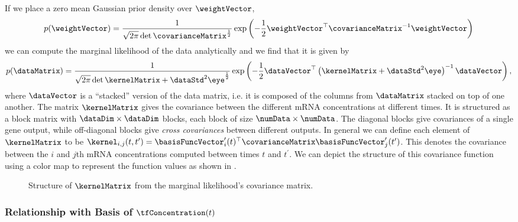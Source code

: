 \documentclass{article}
\begin{document}
If we place a zero mean Gaussian prior density over $\weightVector$,
\[
p(\weightVector)=\frac{1}{\sqrt{2\pi}\det{\covarianceMatrix}^{\frac{1}{2}}}\exp\left(-\frac{1}{2}\weightVector^\top \covarianceMatrix^{-1}\weightVector\right)
\]
we can compute the marginal likelihood of the data analytically and we
find that it is
given by
\[
p(\dataMatrix) = \frac{1}{\sqrt{2\pi}\det{\kernelMatrix + \dataStd^2\eye}^\frac{1}{2}}\exp\left(-\frac{1}{2}\dataVector^\top \left(\kernelMatrix + \dataStd^2\eye\right)^{-1}\dataVector\right),
\]
where $\dataVector$ is a ``stacked'' version of the data matrix,
i.e. it is composed of the columns from $\dataMatrix$ stacked on top
of one another. The matrix $\kernelMatrix$ gives the covariance
between the different mRNA concentrations at different times. It is
structured as a block matrix with $\dataDim\times\dataDim$ blocks,
each block of size $\numData\times\numData$. The diagonal blocks give
covariances of a single gene output, while off-diagonal blocks give
\emph{cross covariances} between different outputs. In general we can define
each element of $\kernelMatrix$ to be $\kernel_{i,j}(t, t^\prime) =
\basisFuncVector^\prime_i(t)^\top\covarianceMatrix\basisFuncVector^\prime_j(t')$. This
denotes the covariance between the $i$ and $j$th mRNA concentrations
computed between times $t$ and $t^\prime$. We can depict the structure
of this covariance function using a color map to represent the
function values as shown in .
\begin{figure}

  \caption{Structure of $\kernelMatrix$ from the marginal likelihood's
    covariance matrix.}\label{fig:covarianceStructure}
\end{figure}

\subsubsection{Relationship with Basis of $\tfConcentration(t)$}
\end{document}
